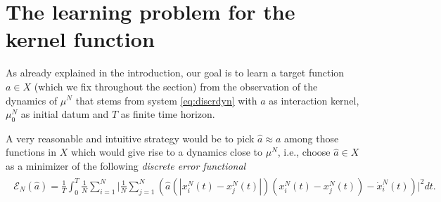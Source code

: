 
\section{The learning problem for the kernel function}\label{sec:learn}

As already explained in the introduction, our goal is to learn a target function $a \in X$ (which we fix throughout the section) from the observation of the dynamics of $\mu^N$ that stems from system \eqref{eq:discrdyn} with $a$ as interaction kernel, $\mu_0^N$ as initial datum and $T$ as finite time horizon.

A very reasonable and intuitive strategy would be to pick $\widehat a \approx a$ among those functions in $X$ which would give rise to a dynamics close to $\mu^N$, i.e., choose $\widehat a \in X$ as a minimizer of the following \textit{discrete error functional}
\begin{align}\label{eq-def-error}
	\begin{split}
	\mathcal E_N(\widehat a) = \frac{1}{T}\int_0^T\frac{1}{N}\sum_{i=1}^N\biggl|\frac{1}{N}\sum_{j=1}^N
			\left(\widehat a(|x^N_i(t)-x^N_j(t)|)(x^N_i(t) - x^N_j(t))-\dot{x}^N_i(t)\right)\biggr|^2 dt.
	\end{split}
\end{align}

